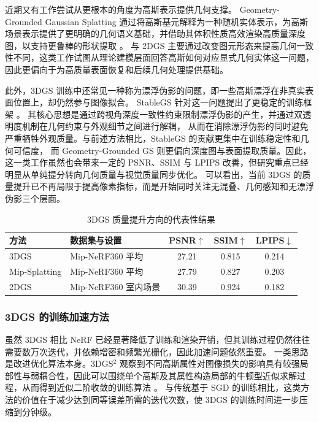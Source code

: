 近期又有工作尝试从更根本的角度为高斯表示提供几何支撑。
Geometry-Grounded Gaussian Splatting 通过将高斯基元解释为一种随机实体表示，为高斯场景表示提供了更明确的几何语义基础，并借助其体积性质高效渲染高质量深度图，以支持更鲁棒的形状提取 \cite{zhang2026geometrygroundedgs}。
与 2DGS 主要通过改变图元形态来提高几何一致性不同，这类工作试图从理论建模层面回答高斯如何对应显式几何实体这一问题，因此更偏向于为高质量表面恢复和后续几何处理提供基础。

此外，3DGS 训练中还常见一种称为漂浮伪影的问题，即一些高斯漂浮在非真实表面位置上，却仍然参与图像拟合。
StableGS 针对这一问题提出了更稳定的训练框架 \cite{wang2025stablegs}。
其核心思想是通过跨视角深度一致性约束限制漂浮伪影的产生，并通过双透明度机制在几何约束与外观细节之间进行解耦，
从而在消除漂浮伪影的同时避免严重牺牲外观质量。与前述方法相比，StableGS 的贡献更集中在训练稳定性和几何可信度，
而 Geometry-Grounded GS 则更偏向深度图与表面提取质量。因此，这一类工作虽然也会带来一定的 PSNR、SSIM 与 LPIPS 改善，但研究重点已经明显从单纯提分转向几何质量与视觉质量同步优化。
可以看出，当前 3DGS 的质量提升已不再局限于提高像素指标，而是开始同时关注无混叠、几何感知和无漂浮伪影三个层面。

\begin{table}[htbp]
    \centering
    \caption{3DGS 质量提升方向的代表性结果}
    \label{tab:gs-quality}
    \small
    \begin{tabular}{llccc}
        \toprule
        方法 & 数据集与设置 & PSNR$\uparrow$ & SSIM$\uparrow$ & LPIPS$\downarrow$ \\
        \midrule
        3DGS & Mip-NeRF360 平均 & 27.21 & 0.815 & 0.214 \\
        Mip-Splatting & Mip-NeRF360 平均 & 27.79 & 0.827 & 0.203 \\
        2DGS & Mip-NeRF360 室内场景 & 30.39 & 0.924 & 0.182 \\
        \bottomrule
    \end{tabular}
\end{table}

\subsubsection{3DGS 的训练加速方法}

虽然 3DGS 相比 NeRF 已经显著降低了训练和渲染开销，但其训练过程仍然往往需要数万次迭代，并依赖增密和频繁光栅化，因此加速问题依然重要。
一类思路是改进优化算法本身。3DGS$^2$ 观察到不同高斯属性对图像损失的影响具有较强局部性与弱耦合性，因此可以围绕单个高斯及其属性构造局部的牛顿型近似求解过程，从而得到近似二阶收敛的训练算法 \cite{lan20253dgs2}。
与传统基于 SGD 的训练相比，这类方法的价值在于减少达到同等误差所需的迭代次数，使 3DGS 的训练时间进一步压缩到分钟级。

